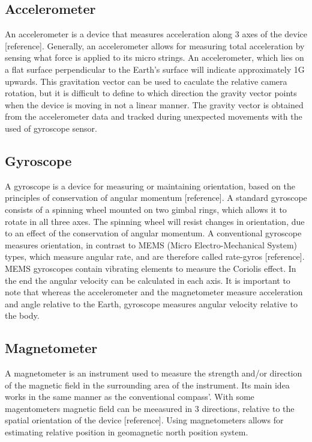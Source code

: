 \subsection{Accelerometer}
An accelerometer is a device that measures acceleration along 3 axes of the device [reference]. Generally, an accelerometer allows for measuring total acceleration by sensing what force is applied to its micro strings. An accelerometer, which lies on a flat surface perpendicular to the Earth's surface will indicate approximately 1G upwards. This gravitation vector can be used to caculate the relative camera rotation, but it is difficult to define to which direction the gravity vector points when the device is moving in not a linear manner. The gravity vector is obtained from the accelerometer data and tracked during unexpected movements with the used of gyroscope sensor.
\subsection{Gyroscope}
A gyroscope is a device for measuring or maintaining orientation, based on the principles of conservation of angular momentum [reference]. A standard gyroscope consists of a spinning wheel mounted on two gimbal rings, which allows it to rotate in all three axes. The spinning wheel will resist changes in orientation, due to an effect of the conservation of angular momentum. A conventional gyroscope measures orientation, in contrast to MEMS (Micro Electro-Mechanical System) types, which measure
angular rate, and are therefore called rate-gyros [reference]. MEMS gyroscopes contain vibrating elements to measure the Coriolis effect. In the end the angular velocity can be calculated in each axis. It is important to note that whereas the accelerometer and the magnetometer measure acceleration and angle relative to the Earth, gyroscope measures angular velocity
relative to the body.
\subsection{Magnetometer}
A magnetometer is an instrument used to measure the strength and/or direction of the magnetic field in the surrounding area of the instrument. Its main idea works in the same manner as the conventional compass'. With some magentometers magnetic field can be meeasured in 3 directions, relative to the spatial orientation of the device [reference]. Using magnetometers allows for estimating relative position in geomagnetic north position system. 
